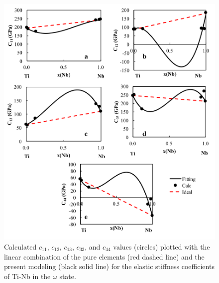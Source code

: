 \pagebreak
\begin{figure}[H]
	\centering
	\includegraphics[width=\textwidth]{Chapter-7/Figures/omegae1.png}
	\caption{Calculated $c_{11}$, $c_{12}$, $c_{13}$, $c_{33}$, and $c_{44}$ values (circles) plotted with the linear combination of the pure elements (red dashed line) and the present modeling (black solid line) for the elastic stiffness coefficients of Ti-Nb in the $\omega$ state.}
	\label{Ch7-figure:omegae1}
\end{figure}

